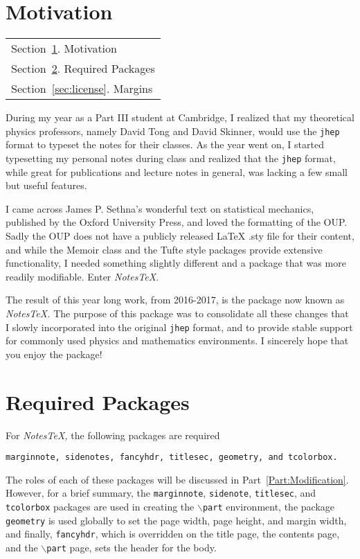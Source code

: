 \section{Motivation}\label{sec:motivation}
\begin{margintable}\vspace{.8in}\footnotesize
  \begin{tabularx}{\marginparwidth}{|X}
  Section~\ref{sec:motivation}. Motivation\\
  Section~\ref{sec:reqpackages}. Required Packages\\
  Section~\ref{sec:license}. Margins\\
  \end{tabularx}
\end{margintable}
During my year as a Part III student at Cambridge, I realized that my theoretical physics professors, namely David Tong and David Skinner, would use the \texttt{jhep} format to typeset the notes for their classes. As the year went on, I started typesetting my personal notes during class and realized that the \texttt{jhep} format, while great for publications and lecture notes in general, was lacking a few small but useful features.

I came across James P. Sethna's wonderful text on statistical mechanics, published by the Oxford University Press, and loved the formatting of the OUP. Sadly the OUP does not have a publicly released LaTeX .sty file for their content, and while the Memoir class and the Tufte style packages provide extensive functionality, I needed something slightly different and a package that was more readily modifiable. Enter \textit{NotesTeX}.

The result of this year long work, from 2016-2017, is the package now known as \textit{NotesTeX.} The purpose of this package was to consolidate all these changes that I slowly incorporated into the original \texttt{jhep} format, and to provide stable support for commonly used physics and mathematics environments. I sincerely hope that you enjoy the package!


\section{Required Packages}\label{sec:reqpackages}
For \textit{NotesTeX,} the following packages are required
\begin{center}
  \texttt{marginnote, sidenotes, fancyhdr, titlesec, geometry, and tcolorbox.}
\end{center}
The roles of each of these packages will be discussed in Part~\ref{Part:Modification}. However, for a brief summary, the \texttt{marginnote}, \texttt{sidenote}, \texttt{titlesec}, and \texttt{tcolorbox} packages are used in creating the \texttt{$\backslash$part} environment, the package \texttt{geometry} is used globally to set the page width, page height, and margin width, and finally, \texttt{fancyhdr}, which is overridden on the title page, the contents page, and the \texttt{$\backslash$part} page, sets the header for the body.

